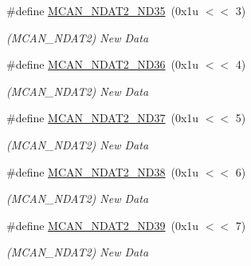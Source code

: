 \begin{DoxyCompactItemize}
\mbox{\label{group__SAME70__MCAN_ga1c5ac1ccd13a1fd446f439eebf5b8920}} 
\#define \mbox{\hyperlink{group__SAME70__MCAN_ga1c5ac1ccd13a1fd446f439eebf5b8920}{M\+C\+A\+N\+\_\+\+N\+D\+A\+T2\+\_\+\+N\+D35}}~(0x1u $<$$<$ 3)
\begin{DoxyCompactList}\small\item\em (M\+C\+A\+N\+\_\+\+N\+D\+A\+T2) New Data \end{DoxyCompactList}\item 
\mbox{\label{group__SAME70__MCAN_gad0ec39dbce8251f9f0231c6fb64774ab}} 
\#define \mbox{\hyperlink{group__SAME70__MCAN_gad0ec39dbce8251f9f0231c6fb64774ab}{M\+C\+A\+N\+\_\+\+N\+D\+A\+T2\+\_\+\+N\+D36}}~(0x1u $<$$<$ 4)
\begin{DoxyCompactList}\small\item\em (M\+C\+A\+N\+\_\+\+N\+D\+A\+T2) New Data \end{DoxyCompactList}\item 
\mbox{\label{group__SAME70__MCAN_ga7c48dcd37e65dbf80870de7fea4066a6}} 
\#define \mbox{\hyperlink{group__SAME70__MCAN_ga7c48dcd37e65dbf80870de7fea4066a6}{M\+C\+A\+N\+\_\+\+N\+D\+A\+T2\+\_\+\+N\+D37}}~(0x1u $<$$<$ 5)
\begin{DoxyCompactList}\small\item\em (M\+C\+A\+N\+\_\+\+N\+D\+A\+T2) New Data \end{DoxyCompactList}\item 
\mbox{\label{group__SAME70__MCAN_gaed33b03f888b477b2dc7007e14fec536}} 
\#define \mbox{\hyperlink{group__SAME70__MCAN_gaed33b03f888b477b2dc7007e14fec536}{M\+C\+A\+N\+\_\+\+N\+D\+A\+T2\+\_\+\+N\+D38}}~(0x1u $<$$<$ 6)
\begin{DoxyCompactList}\small\item\em (M\+C\+A\+N\+\_\+\+N\+D\+A\+T2) New Data \end{DoxyCompactList}\item 
\mbox{\label{group__SAME70__MCAN_ga9ce47b98b6484fe397280304b376ecb7}} 
\#define \mbox{\hyperlink{group__SAME70__MCAN_ga9ce47b98b6484fe397280304b376ecb7}{M\+C\+A\+N\+\_\+\+N\+D\+A\+T2\+\_\+\+N\+D39}}~(0x1u $<$$<$ 7)
\begin{DoxyCompactList}\small\item\em (M\+C\+A\+N\+\_\+\+N\+D\+A\+T2) New Data \end{DoxyCompactList}\item 
$$
\end{DoxyCompactItemize}
